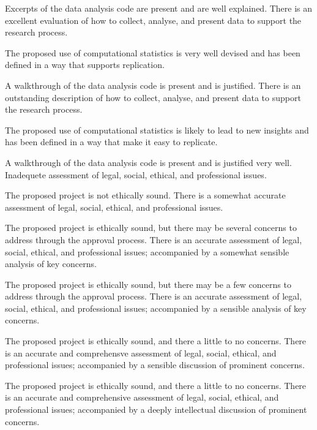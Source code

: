 \begin{markingrubric}
        \par		Excerpts of the data analysis code are present and are well explained.   
        \grade 		There is an excellent evaluation of how to collect, analyse, and present data to support the research process.
         \par		The proposed use of computational statistics is very well devised and has been defined in a way that supports replication.      
        \par		A walkthrough of the data analysis code is present and is justified.   
        \grade 		There is an outstanding description of how to collect, analyse, and present data to support the research process.
         \par		The proposed use of computational statistics is likely to lead to new insights and has been defined in a way that make it easy to replicate.        
        \par		A walkthrough of the data analysis code is present and is justified very well. 
%
        \grade\fail 	Inadequete assessment of legal, social, ethical, and professional issues.
         \par		The proposed project is not ethically sound.
        \grade 		There is a somewhat accurate assessment of legal, social, ethical, and professional issues.
        \par		The proposed project is ethically sound, but there may be several concerns to address through the approval process.
        \grade 		There is an accurate assessment of legal, social, ethical, and professional issues; accompanied by a somewhat sensible analysis of key concerns.
        \par		The proposed project is ethically sound, but there may be a few concerns to address through the approval process.
        \grade 		There is an accurate assessment of legal, social, ethical, and professional issues; accompanied by a sensible analysis of key concerns.
        \par		The proposed project is ethically sound, and there a little to no concerns.
        \grade 		There is an accurate and comprehensve assessment of legal, social, ethical, and professional issues; accompanied by a sensible discussion of prominent concerns.
        \par		The proposed project is ethically sound, and there a little to no concerns.
        \grade 		There is an accurate and comprehensive assessment of legal, social, ethical, and professional issues; accompanied by a deeply intellectual discussion of prominent concerns.

\end{markingrubric}
